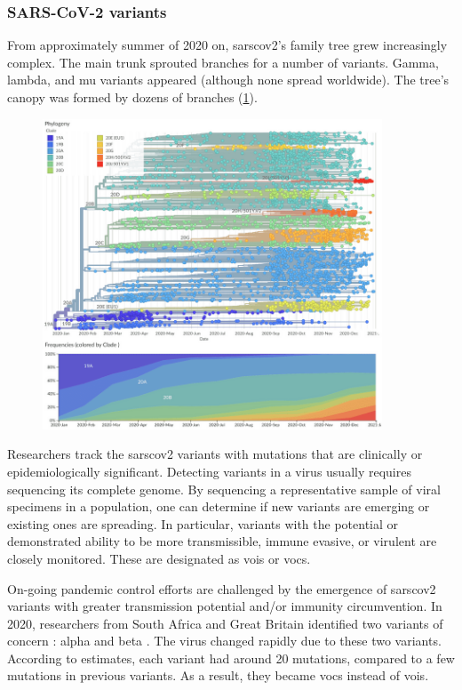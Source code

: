         \subsubsection{SARS-CoV-2 variants}
        From approximately summer of 2020 on, \acrshort{sarscov2}'s family tree grew increasingly complex. The main trunk sprouted branches for a number of variants. Gamma, lambda, and mu variants appeared (although none spread worldwide). The tree's canopy was formed by dozens of branches (\cref{fig:intro:nextstrain}).
        \begin{figure}[h]
        	\centering
        	\includegraphics[width=0.9\textwidth]{figures/intro/nextstrain-global.png}
        	\label{fig:intro:nextstrain}
        \end{figure}
        Researchers track the \acrshort{sarscov2} variants with mutations that are clinically or epidemiologically significant. Detecting variants in a virus usually requires sequencing its complete genome. By sequencing a representative sample of viral specimens in a population, one can determine if new variants are emerging or existing ones are spreading. In particular, variants with the potential or demonstrated ability to be more transmissible, immune evasive, or virulent are closely monitored. These are designated as \acrfull{vois} or \acrfull{vocs}.
        
        On-going pandemic control efforts are challenged by the emergence of \acrshort{sarscov2} variants with greater transmission potential and/or immunity circumvention. In 2020, researchers from South Africa and Great Britain identified two variants of concern \cite{voc2022}: alpha and beta \cite{planas2021}. The virus changed rapidly due to these two variants. According to estimates, each variant had around 20 mutations, compared to a few mutations in previous variants. As a result, they became \acrshort{vocs} instead of \acrshort{vois}.
        
